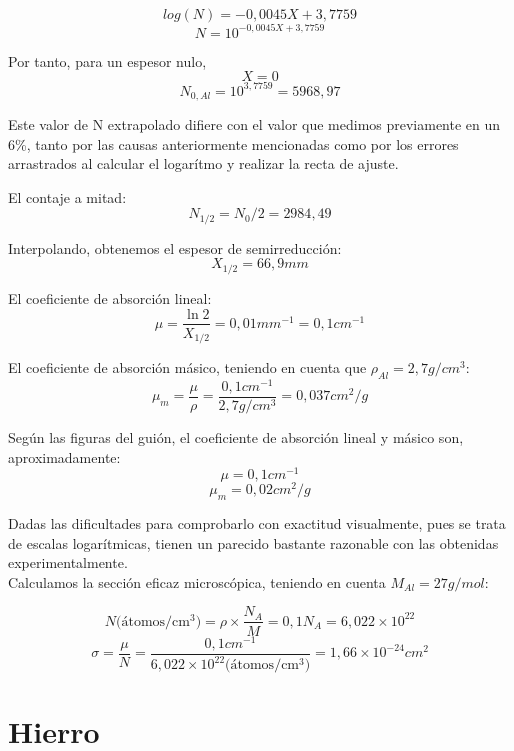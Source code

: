 \documentclass[a4paper,12pt,spanish]{article}
\begin{document}
	
	\[ log(N) = -0,0045 X + 3,7759
	\]
	\[ N = 10^{-0,0045 X + 3,7759}
	\]
	
	Por tanto, para un espesor nulo,
	\[ X = 0
	\]
	\[N_{0, Al} = 10^{3,7759} = 5968,97\]
	
	
	Este valor de N extrapolado difiere con el valor que medimos previamente en un 6\%, tanto por las causas anteriormente mencionadas como por los errores arrastrados al calcular el logarítmo y realizar la recta de ajuste.
	
	
	El contaje a mitad:
	\[N_{1/2} = N_0 /2 = 2984,49
	\]
	
	Interpolando, obtenemos el espesor de semirreducción:
	\[ X_{1/2} = 66,9 \si{mm}
	\]
	
	El coeficiente de absorción lineal:
	\[ \mu = \frac{\ln 2}{X_{1/2}} = 0,01 \si{mm^{-1}} = 0,1\si{cm^{-1}}
	\]
	
	El coeficiente de absorción másico, teniendo en cuenta que $\rho_{Al} = 2,7 \si{g/cm^3} $:
	\[ \mu_m = \frac{\mu}{\rho} = \frac{0,1\si{cm^{-1}}}{2,7\si{g/cm^3}} = 0,037 \si{cm^2/g}
	\]
	
	Según las figuras del guión, el coeficiente de absorción lineal y másico son, aproximadamente:
	\[ \mu = 0,1\si{cm^{-1}}
	\]
	\[\mu_m = 0,02 \si{cm^2/g}    \]
	
	Dadas las dificultades para comprobarlo con exactitud visualmente, pues se trata de escalas logarítmicas, tienen un parecido bastante razonable con las obtenidas experimentalmente.\\
	
	
	Calculamos la sección eficaz microscópica, teniendo en cuenta $M_{Al}= 27\si{g/mol}$:
	
	\[ N \text{(átomos/cm$^3$)} = \rho \times \frac{N_A}{M} = 0,1 N_A = 6,022\times10^{22}
	\]
	\[ \sigma = \frac{\mu}{N} = \frac{0,1\si{cm^{-1}}}{6,022\times10^{22} \text{(átomos/cm$^3$)}} = 1,66\times 10^{-24} \si{cm^2}
	\]
	

	



	\section{Hierro}
	
	
	
	
\end{document}
